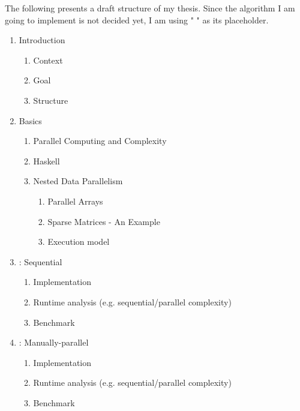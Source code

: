 \documentclass{article}
\begin{document}
        The following presents a draft structure of my thesis.
        Since the algorithm I am going to implement is not decided yet, I am using " " as its placeholder.

        \begin{enumerate}

        \item Introduction
            \begin{enumerate}
            \item Context
            \item Goal
            \item Structure
            \end{enumerate}

        \item Basics
            \begin{enumerate}
            \item Parallel Computing and Complexity
            \item Haskell
            \item Nested Data Parallelism
                \begin{enumerate}
                \item Parallel Arrays
                \item Sparse Matrices - An Example
                \item Execution model
                \end{enumerate}
            \end{enumerate}

        \item   : Sequential
            \begin{enumerate}
            \item Implementation
            \item Runtime analysis {\tiny (e.g. sequential/parallel complexity)}
            \item Benchmark
            \end{enumerate}

        \item   : Manually-parallel
            \begin{enumerate}
            \item Implementation
            \item Runtime analysis {\tiny (e.g. sequential/parallel complexity)}
            \item Benchmark
            \end{enumerate}


\end{enumerate}
\end{document}

